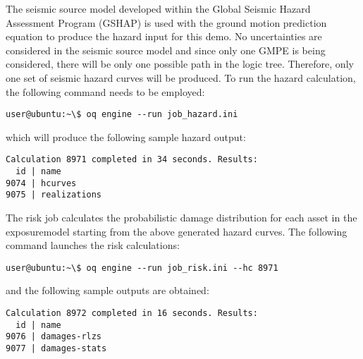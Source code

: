 The seismic source model developed within the Global Seismic Hazard Assessment
Program (GSHAP) is used with the \cite{chiou2008} ground motion prediction
equation to produce the hazard input for this demo. No uncertainties are
considered in the seismic source model and since only one GMPE is being
considered, there will be only one possible path in the logic tree. Therefore,
only one set of seismic hazard curves will be produced. To run the hazard
calculation, the following command needs to be employed:

\begin{verbatim}
user@ubuntu:~\$ oq engine --run job_hazard.ini
\end{verbatim}

which will produce the following sample hazard output:

\begin{verbatim}
Calculation 8971 completed in 34 seconds. Results:
  id | name
9074 | hcurves
9075 | realizations
\end{verbatim}

The risk job calculates the probabilistic damage distribution for each asset
in the \gls{exposuremodel} starting from the above generated hazard curves. The
following command launches the risk calculations:

\begin{verbatim}
user@ubuntu:~\$ oq engine --run job_risk.ini --hc 8971
\end{verbatim}

and the following sample outputs are obtained:

\begin{verbatim}
Calculation 8972 completed in 16 seconds. Results:
  id | name
9076 | damages-rlzs
9077 | damages-stats
\end{verbatim}
